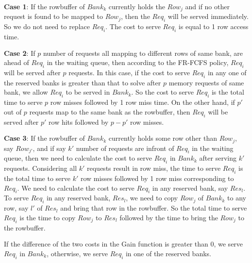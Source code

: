 \begin{description}
 \item {\bf Case 1}: If the rowbuffer of $Bank_{k}$ currently holds the $Row_{j}$ and if no other request is found to be 
 mapped to $Row_{j}$, then the $Req_{i}$ will be served immediately. So we do not need to replace $Req_{i}$. The cost to 
 serve $Req_{i}$ is equal to 1 row access time.
 
 \item {\bf Case 2}: If $p$ number of requests all mapping to different rows of same bank, are ahead of $Req_{i}$ in the 
 waiting queue, then according to the FR-FCFS 
 policy, $Req_{i}$ will be served after $p$ requests. In this case, if the cost to serve $Req_{i}$ in any one of the reserved 
 banks is greater than that to solve after $p$ memory requests of same bank, we allow $Req_{i}$ to be served in $Bank_{k}$.
 So the cost to serve $Req_{i}$ is the total time to serve $p$ row misses followed by 1 row miss time. On the other hand, 
 if $p'$ out of $p$ requests map to the same bank as the rowbuffer, then $Req_{i}$ will be served after $p'$ row hits
 followed by $p - p'$ row misses. 
 
 \item {\bf Case 3}: If the rowbuffer of $Bank_{k}$ currently holds some row other than $Row_{j}$, say $Row_{j'}$, and if 
 say $k'$ number of requests are infront of $Req_{i}$ in the waiting queue, then we need to calculate the cost to serve 
 $Req_{i}$ in $Bank_{k}$ after serving $k'$ requests. Considering all $k'$ requests result in row miss, the time to serve 
 $Req_{i}$ is the total time to serve $k'$ row misses followed by 1 row miss corresponding to $Req_{i}$. We need to calculate 
 the cost to serve $Req_{i}$ in any reserved bank, say $Res_{l}$. To serve $Req_{i}$ in any reserved bank, $Res_{l}$, we need 
 to copy $Row_{j}$ of $Bank_{k}$ to any row, say $l'$ of $Res_{l}$ and bring that row in the rowbuffer. So the total time to 
 serve $Req_{i}$ is the time to copy $Row_{j}$ to $Res_{l}$ followed by the time to bring the $Row_{j}$ to the rowbuffer.  
\end{description}

\noindent
If the difference of the two costs in the Gain function is greater than 0, we serve $Req_{i}$ in $Bank_{k}$, otherwise, we 
serve $Req_{i}$ in one of the reserved banks. 

